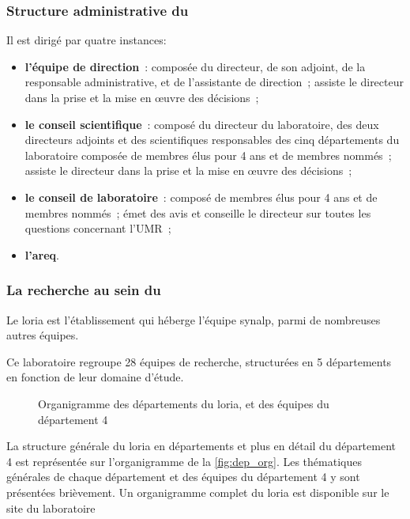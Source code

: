 \subsubsection*{Structure administrative du }
Il est dirigé par quatre instances\autocite{organisation_loria}:
\begin{itemize}
	\item \textbf{l'équipe de direction}~: composée du directeur, de son adjoint, de la responsable administrative, et de l'assistante de direction~; assiste le directeur dans la prise et la mise en œuvre des décisions~;
	\item \textbf{le conseil scientifique}~: composé du directeur du laboratoire, des deux directeurs adjoints et des scientifiques responsables des cinq départements du laboratoire composée de membres élus pour 4 ans et de membres nommés~; assiste le directeur dans la prise et la mise en œuvre des décisions~;
	\item \textbf{le conseil de laboratoire}~: composé de membres élus pour 4 ans et de membres nommés~; émet des avis et conseille le directeur sur toutes les questions concernant l’UMR~;
	\item \textbf{l'\gls{areq}}.
\end{itemize}

\subsubsection*{La recherche au sein du }
Le \gls{loria} est l'établissement qui héberge l'équipe \gls{synalp}, parmi de nombreuses autres équipes.

Ce laboratoire regroupe 28 équipes de recherche, structurées en 5 départements en fonction de leur domaine d'étude.

\begin{figure}[h]
	\centering
	\scalebox{1}{}
	\caption{Organigramme des départements du \gls{loria}, et des équipes du département 4}
	\label{fig:dep_org}
\end{figure}

La structure générale du \gls{loria} en départements et plus en détail du département 4 est représentée sur l'organigramme de la \autoref{fig:dep_org}. %
Les thématiques générales de chaque département et des équipes du département 4 y sont présentées brièvement.
Un organigramme complet du \gls{loria} est disponible sur {le site du laboratoire \autocite{org_loria}}

